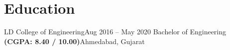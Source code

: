 \section{Education}
    \resumeSubHeadingListStart

    \resumeSubheading
    {LD College of Engineering}{Aug 2016 -- May 2020}
    {\hspace{0.5cm}Bachelor of Engineering \hspace{3.5cm} \textbf{(CGPA: 8.40 / 10.00)}}{Ahmedabad, Gujarat}

    \resumeSubHeadingListEnd